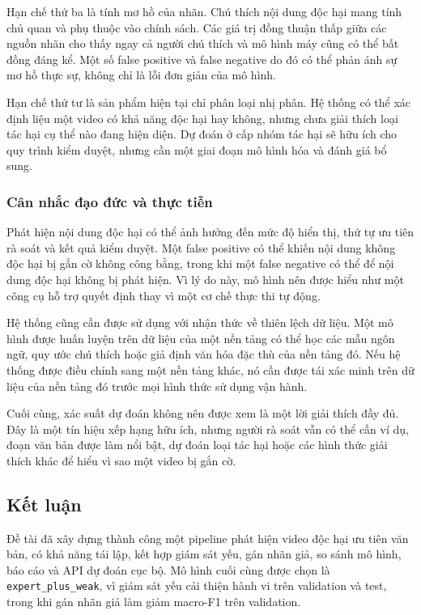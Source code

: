 Hạn chế thứ ba là tính mơ hồ của nhãn. Chú thích nội dung độc hại mang tính chủ quan và phụ thuộc vào chính sách. Các giá trị đồng thuận thấp giữa các nguồn nhãn cho thấy ngay cả người chú thích và mô hình máy cũng có thể bất đồng đáng kể. Một số false positive và false negative do đó có thể phản ánh sự mơ hồ thực sự, không chỉ là lỗi đơn giản của mô hình.

Hạn chế thứ tư là sản phẩm hiện tại chỉ phân loại nhị phân. Hệ thống có thể xác định liệu một video có khả năng độc hại hay không, nhưng chưa giải thích loại tác hại cụ thể nào đang hiện diện. Dự đoán ở cấp nhóm tác hại sẽ hữu ích cho quy trình kiểm duyệt, nhưng cần một giai đoạn mô hình hóa và đánh giá bổ sung.

\subsubsection{Cân nhắc đạo đức và thực tiễn}

Phát hiện nội dung độc hại có thể ảnh hưởng đến mức độ hiển thị, thứ tự ưu tiên rà soát và kết quả kiểm duyệt. Một false positive có thể khiến nội dung không độc hại bị gắn cờ không công bằng, trong khi một false negative có thể để nội dung độc hại không bị phát hiện. Vì lý do này, mô hình nên được hiểu như một công cụ hỗ trợ quyết định thay vì một cơ chế thực thi tự động.

Hệ thống cũng cần được sử dụng với nhận thức về thiên lệch dữ liệu. Một mô hình được huấn luyện trên dữ liệu của một nền tảng có thể học các mẫu ngôn ngữ, quy ước chú thích hoặc giả định văn hóa đặc thù của nền tảng đó. Nếu hệ thống được điều chỉnh sang một nền tảng khác, nó cần được tái xác minh trên dữ liệu của nền tảng đó trước mọi hình thức sử dụng vận hành.

Cuối cùng, xác suất dự đoán không nên được xem là một lời giải thích đầy đủ. Đây là một tín hiệu xếp hạng hữu ích, nhưng người rà soát vẫn có thể cần ví dụ, đoạn văn bản được làm nổi bật, dự đoán loại tác hại hoặc các hình thức giải thích khác để hiểu vì sao một video bị gắn cờ.

\subsection{Kết luận}

Đề tài đã xây dựng thành công một pipeline phát hiện video độc hại ưu tiên văn bản, có khả năng tái lập, kết hợp giám sát yếu, gán nhãn giả, so sánh mô hình, báo cáo và API dự đoán cục bộ. Mô hình cuối cùng được chọn là \texttt{expert\_plus\_weak}, vì giám sát yếu cải thiện hành vi trên validation và test, trong khi gán nhãn giả làm giảm macro-F1 trên validation.

